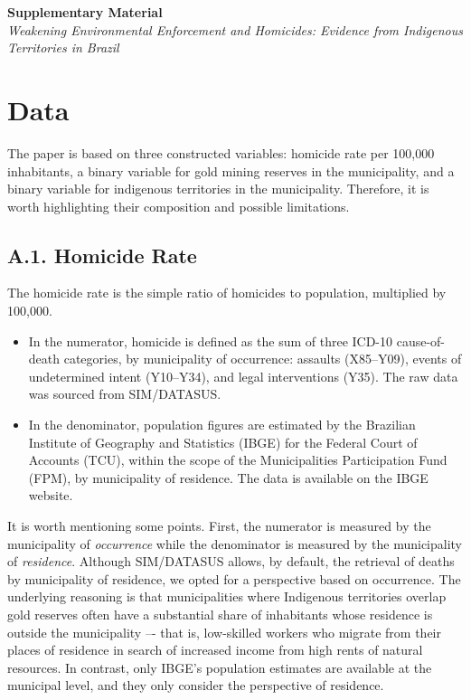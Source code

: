 \documentclass[preprint,12pt]{elsarticle}
\begin{document}
\begin{center}
    {\Large\bfseries Supplementary Material}\\[0.3em]
    {\normalsize\itshape Weakening Environmental Enforcement and Homicides: Evidence from Indigenous Territories in Brazil}
\end{center}

\vspace{1em}

\section{Data} \label{ap:data}

The paper is based on three constructed variables: homicide rate per 100,000 inhabitants, a binary variable for gold mining reserves in the municipality, and a binary variable for indigenous territories in the municipality. Therefore, it is worth highlighting their composition and possible limitations.     

\subsection*{A.1. Homicide Rate}

The homicide rate is the simple ratio of homicides to population, multiplied by 100,000.

\begin{itemize}
    \item In the numerator, homicide is defined as the sum of three ICD-10 cause-of-death categories, by municipality of occurrence: assaults (X85–Y09), events of undetermined intent (Y10–Y34), and legal interventions (Y35). The raw data was sourced from SIM/DATASUS.
    
    \item In the denominator, population figures are estimated by the Brazilian Institute of Geography and Statistics (IBGE) for the Federal Court of Accounts (TCU), within the scope of the Municipalities Participation Fund (FPM), by municipality of residence. The data is available on the IBGE website.
\end{itemize}

It is worth mentioning some points. First, the numerator is measured by the municipality of \textit{occurrence} while the denominator is measured by the municipality of \textit{residence}. Although SIM/DATASUS allows, by default, the retrieval of deaths by municipality of residence, we opted for a perspective based on occurrence. The underlying reasoning is that municipalities where Indigenous territories overlap gold reserves often have a substantial share of inhabitants whose residence is outside the municipality –- that is, low-skilled workers who migrate from their places of residence in search of increased income from high rents of natural resources. In contrast, only IBGE's population estimates are available at the municipal level, and they only consider the perspective of residence.
\end{document}
